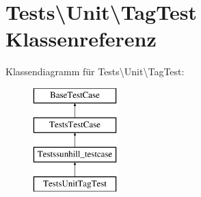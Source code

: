 \hypertarget{classTests_1_1Unit_1_1TagTest}{}\section{Tests\textbackslash{}Unit\textbackslash{}Tag\+Test Klassenreferenz}
\label{classTests_1_1Unit_1_1TagTest}
Klassendiagramm für Tests\textbackslash{}Unit\textbackslash{}Tag\+Test\+:\begin{figure}[H]
\begin{center}
\leavevmode
\includegraphics[height=4.000000cm]{d5/d34/classTests_1_1Unit_1_1TagTest}
\end{center}
\end{figure}
